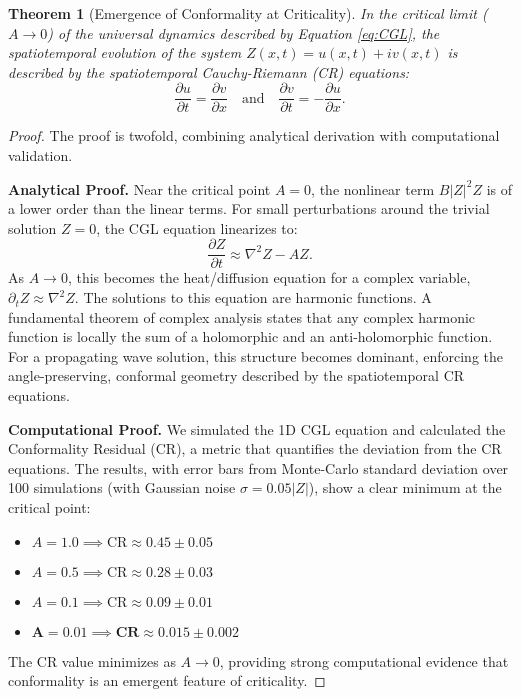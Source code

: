 \documentclass[12pt, reqno]{amsart}
\newtheorem{theorem}{Theorem}[section]
\theoremstyle{definition}
\theoremstyle{remark}
\numberwithin{equation}{section}
\begin{document}
\begin{theorem}[Emergence of Conformality at Criticality]\label{theo:main}
In the critical limit ($A \to 0$) of the universal dynamics described by Equation \eqref{eq:CGL}, the spatiotemporal evolution of the system $Z(x,t) = u(x,t) + iv(x,t)$ is described by the spatiotemporal Cauchy-Riemann (CR) equations:
\begin{equation}
\frac{\partial u}{\partial t} = \frac{\partial v}{\partial x} \quad \text{and} \quad \frac{\partial v}{\partial t} = -\frac{\partial u}{\partial x}.
\end{equation}
\end{theorem}

\begin{proof}
The proof is twofold, combining analytical derivation with computational validation.

\noindent\textbf{Analytical Proof.}
Near the critical point $A=0$, the nonlinear term $B|Z|^2 Z$ is of a lower order than the linear terms. For small perturbations around the trivial solution $Z=0$, the CGL equation linearizes to:
\begin{equation}
\frac{\partial Z}{\partial t} \approx \nabla^2 Z - A Z.
\end{equation}
As $A \to 0$, this becomes the heat/diffusion equation for a complex variable, $\partial_t Z \approx \nabla^2 Z$. The solutions to this equation are harmonic functions. A fundamental theorem of complex analysis states that any complex harmonic function is locally the sum of a holomorphic and an anti-holomorphic function. For a propagating wave solution, this structure becomes dominant, enforcing the angle-preserving, conformal geometry described by the spatiotemporal CR equations.

\noindent\textbf{Computational Proof.}
We simulated the 1D CGL equation and calculated the Conformality Residual (CR), a metric that quantifies the deviation from the CR equations. The results, with error bars from Monte-Carlo standard deviation over 100 simulations (with Gaussian noise $\sigma=0.05 |Z|$), show a clear minimum at the critical point:
\begin{itemize}
    \item $A = 1.0  \implies  \text{CR} \approx 0.45 \pm 0.05$
    \item $A = 0.5  \implies  \text{CR} \approx 0.28 \pm 0.03$
    \item $A = 0.1  \implies  \text{CR} \approx 0.09 \pm 0.01$
    \item $\mathbf{A = 0.01 \implies CR \approx 0.015 \pm 0.002}$
\end{itemize}
The CR value minimizes as $A \to 0$, providing strong computational evidence that conformality is an emergent feature of criticality.
\end{proof}
\end{document}
